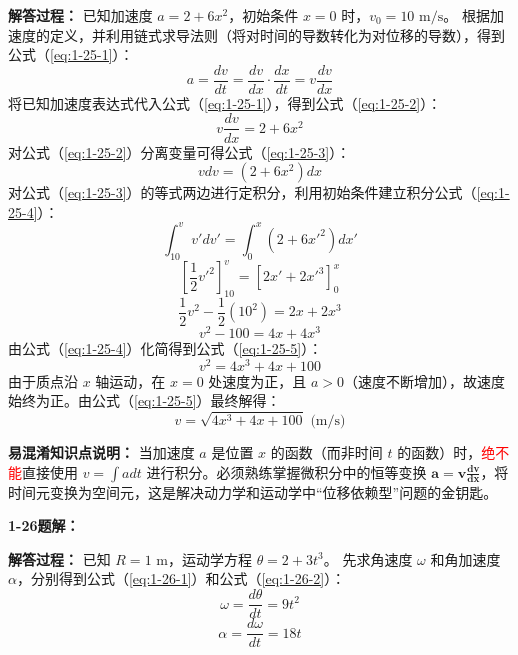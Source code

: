 \textbf{解答过程：}
已知加速度 $a = 2 + 6x^2$，初始条件 $x=0$ 时，$v_0 = 10 \text{ m/s}$。
根据加速度的定义，并利用链式求导法则（将对时间的导数转化为对位移的导数），得到公式（\ref{eq:1-25-1}）：
\begin{equation}\label{eq:1-25-1}
	a = \frac{dv}{dt} = \frac{dv}{dx} \cdot \frac{dx}{dt} = v \frac{dv}{dx}
\end{equation}
将已知加速度表达式代入公式（\ref{eq:1-25-1}），得到公式（\ref{eq:1-25-2}）：
\begin{equation}\label{eq:1-25-2}
	v \frac{dv}{dx} = 2 + 6x^2
\end{equation}
对公式（\ref{eq:1-25-2}）分离变量可得公式（\ref{eq:1-25-3}）：
\begin{equation}\label{eq:1-25-3}
	v dv = (2 + 6x^2) dx
\end{equation}
对公式（\ref{eq:1-25-3}）的等式两边进行定积分，利用初始条件建立积分公式（\ref{eq:1-25-4}）：
\begin{equation}\label{eq:1-25-4}
	\int_{10}^{v} v' dv' = \int_{0}^{x} (2 + 6x'^2) dx'
\end{equation}
$$ \left[ \frac{1}{2}v'^2 \right]_{10}^{v} = \left[ 2x' + 2x'^3 \right]_{0}^{x} $$
$$ \frac{1}{2}v^2 - \frac{1}{2}(10^2) = 2x + 2x^3 $$
$$ v^2 - 100 = 4x + 4x^3 $$
由公式（\ref{eq:1-25-4}）化简得到公式（\ref{eq:1-25-5}）：
\begin{equation}\label{eq:1-25-5}
	v^2 = 4x^3 + 4x + 100
\end{equation}
由于质点沿 $x$ 轴运动，在 $x=0$ 处速度为正，且 $a > 0$（速度不断增加），故速度始终为正。由公式（\ref{eq:1-25-5}）最终解得：
$$ v = \sqrt{4x^3 + 4x + 100} \text{ (m/s)} $$

\textbf{易混淆知识点说明：}
当加速度 $a$ 是位置 $x$ 的函数（而非时间 $t$ 的函数）时，\textcolor{red}{绝不能}直接使用 $v = \int a dt$ 进行积分。必须熟练掌握微积分中的恒等变换 $\mathbf{a = v \frac{dv}{dx}}$，将时间元变换为空间元，这是解决动力学和运动学中“位移依赖型”问题的金钥匙。

\vspace{2em}

\textbf{1-26题解：}
\setcounter{equation}{0}
\renewcommand{\theHequation}{1-26.\arabic{equation}}

\textbf{解答过程：}
已知 $R = 1\text{ m}$，运动学方程 $\theta = 2 + 3t^3$。
先求角速度 $\omega$ 和角加速度 $\alpha$，分别得到公式（\ref{eq:1-26-1}）和公式（\ref{eq:1-26-2}）：
\begin{equation}\label{eq:1-26-1}
	\omega = \frac{d\theta}{dt} = 9t^2
\end{equation}
\begin{equation}\label{eq:1-26-2}
	\alpha = \frac{d\omega}{dt} = 18t
\end{equation}

